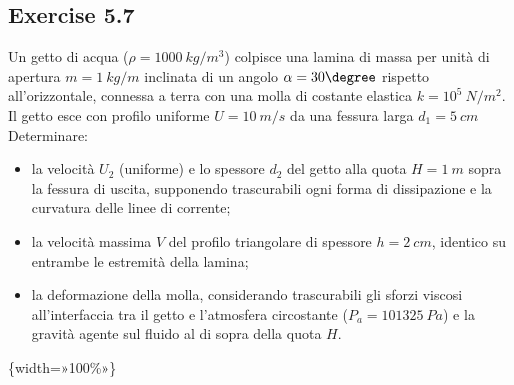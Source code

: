 \documentclass[letterpaper,10pt,italian]{jupyterBook}
\begin{document}
\subsection{Exercise 5.7}
\label{\detokenize{polimi/fluidmechanics-ita/template/capitoli/05_bernoulli/0508in:exercise-5-7}}\label{\detokenize{polimi/fluidmechanics-ita/template/capitoli/05_bernoulli/0508in:fluid-mechanics-bernoulli-ex-07}}\label{\detokenize{polimi/fluidmechanics-ita/template/capitoli/05_bernoulli/0508in::doc}}
\sphinxAtStartPar
Un getto di acqua (\(\rho = 1000 \ kg/m^3\)) colpisce una lamina di massa
per unità di apertura \(m = 1 \ kg/m\) inclinata di un angolo
\(\alpha = 30\degree\) rispetto all’orizzontale, connessa a terra con una
molla di costante elastica \(k = 10^5 \ N/m^2\). Il getto esce con profilo
uniforme \(U=10 \ m/s\) da una fessura larga \(d_1 = 5 \ cm\) Determinare:
\begin{itemize}
\item {} 
\sphinxAtStartPar
la velocità \(U_2\) (uniforme) e lo spessore \(d_2\) del getto alla
quota \(H=1 \ m\) sopra la fessura di uscita, supponendo trascurabili
ogni forma di dissipazione e la curvatura delle linee di corrente;

\item {} 
\sphinxAtStartPar
la velocità massima \(V\) del profilo triangolare di spessore
\(h = 2 \ cm\), identico su entrambe le estremità della lamina;

\item {} 
\sphinxAtStartPar
la deformazione della molla, considerando trascurabili gli sforzi
viscosi all’interfaccia tra il getto e l’atmosfera circostante
(\(P_a = 101325 \ Pa\)) e la gravità agente sul fluido al di sopra
della quota \(H\).

\end{itemize}

\sphinxAtStartPar
{}\{width=»100\%»\}
\end{document}
